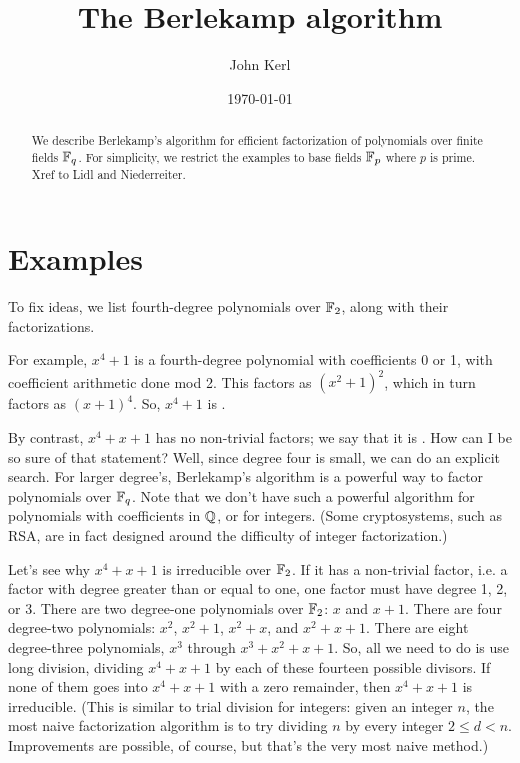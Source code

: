 \documentclass[10pt]{article}
\numberwithin{equation}{subsection}
\begin{document}
\title{The Berlekamp algorithm}
\author{John Kerl}
\date{\today}

\maketitle
\begin{abstract}
We describe Berlekamp's algorithm for efficient factorization of polynomials
over finite fields $\mathbb{F}_q$.  For simplicity, we restrict the examples to base
fields $\mathbb{F}_p$ where $p$ is prime.  Xref to Lidl and Niederreiter.
\end{abstract}

\tableofcontents

\newpage
\section{Examples}

To fix ideas, we list fourth-degree polynomials over $\mathbb{F}_2$, along with their
factorizations.

For example, $x^4 + 1$ is a fourth-degree polynomial with coefficients 0 or 1,
with coefficient arithmetic done mod 2.  This factors as $(x^2+1)^2$, which in
turn factors as $(x+1)^4$.  So, $x^4+1$ is .

By contrast, $x^4+x+1$ has no non-trivial factors; we say that it is
.  How can I be so sure of that statement?  Well, since
degree four is small, we can do an explicit search.  For larger degree's,
Berlekamp's algorithm is a powerful way to factor polynomials over $\mathbb{F}_q$.  Note
that we don't have such a powerful algorithm for polynomials with coefficients
in $\mathbb{Q}$, or for integers.  (Some cryptosystems, such as RSA, are in fact
designed around the difficulty of integer factorization.)

Let's see why $x^4+x+1$ is irreducible over $\mathbb{F}_2$.  If it has a non-trivial
factor, i.e. a factor with degree greater than or equal to one, one factor must
have degree 1, 2, or 3.  There are two degree-one polynomials over $\mathbb{F}_2$:  $x$
and $x+1$.  There are four degree-two polynomials: $x^2$, $x^2+1$, $x^2+x$, and
$x^2+x+1$.  There are eight degree-three polynomials, $x^3$ through
$x^3+x^2+x+1$.  So, all we need to do is use long division, dividing $x^4+x+1$
by each of these fourteen possible divisors.  If none of them goes into
$x^4+x+1$ with a zero remainder, then $x^4+x+1$ is irreducible.  (This is
similar to trial division for integers:  given an integer $n$, the most naive
factorization algorithm is to try dividing $n$ by every integer $2 \le d < n$.
Improvements are possible, of course, but that's the very most naive method.)
\end{document}
